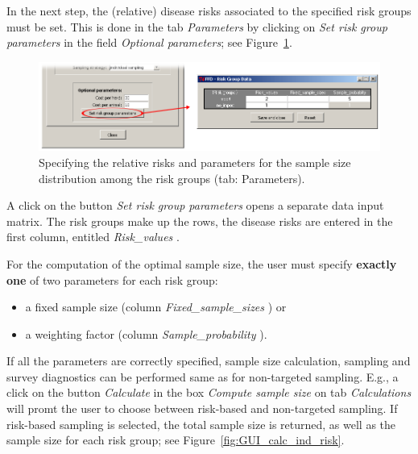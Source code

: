 \documentclass[nojss]{jss}
\begin{document}
In the next step, the (relative) disease risks associated to the specified risk groups must be set. This is done in the tab \emph{Parameters}  by clicking on  \emph{Set risk group parameters} in the field  \emph{Optional parameters}; see Figure~\ref{fig:GUI_Risk_Data}.

\begin{figure}[h!t]
\begin{center}
\includegraphics[width=125mm]{GUI_Risk_Data.png}
\end{center}
\caption{Specifying the relative risks and parameters for the sample size distribution among the risk groups (tab: Parameters).}
\label{fig:GUI_Risk_Data} \end{figure}

A click on the button \emph{Set risk group parameters} opens a separate data input matrix. The risk groups make up the rows, the disease risks are entered in the first column, entitled \emph{Risk\_values} . 

For the computation of the optimal sample size, the user must specify \textbf{exactly one} of two parameters for each risk group:
%
\begin{itemize}
\item a fixed sample size (column \emph{Fixed\_sample\_sizes} ) or
\item a weighting factor (column \emph{Sample\_probability} ).
\end{itemize}
%

If all the parameters are correctly specified, sample size calculation, sampling and survey diagnostics can be performed same as for non-targeted sampling. E.g., a click on the button \emph{Calculate} in the box \emph{Compute sample size} on tab \emph{Calculations} will promt the user to choose between risk-based and non-targeted sampling. If risk-based sampling is selected, the total sample size is returned, as well as the sample size for each risk group; see Figure~\ref{fig:GUI_calc_ind_risk}.
\end{document}

